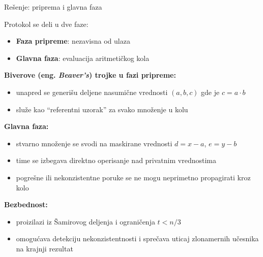 \documentclass[aspectratio=1610]{beamer}
\begin{document}
\begin{frame}{Rešenje: priprema i glavna faza}

Protokol se deli u dve faze:

\begin{itemize}
    \item \textbf{Faza pripreme}: nezavisna od ulaza
    \item \textbf{Glavna faza}: evaluacija aritmetičkog kola
\end{itemize}

\textbf{Biverove (eng. \textit{Beaver's}) trojke u fazi pripreme:}
\begin{itemize}
    \item unapred se generišu deljene nasumične vrednosti $(a,b,c)$ gde je $c=a\cdot b$
    \item služe kao “referentni uzorak” za svako množenje u kolu
\end{itemize}

\textbf{Glavna faza:}
\begin{itemize}
    \item stvarno množenje se svodi na maskirane vrednosti $d=x-a$, $e=y-b$
    \item time se izbegava direktno operisanje nad privatnim vrednostima
    \item pogrešne ili nekonzistentne poruke se ne mogu neprimetno propagirati kroz kolo
\end{itemize}

\textbf{Bezbednost:}
\begin{itemize}
    \item proizilazi iz Šamirovog deljenja i ograničenja $t < n/3$
    \item omogućava detekciju nekonzistentnosti i sprečava uticaj zlonamernih učesnika na krajnji rezultat
\end{itemize}

\end{frame}



\end{document}
